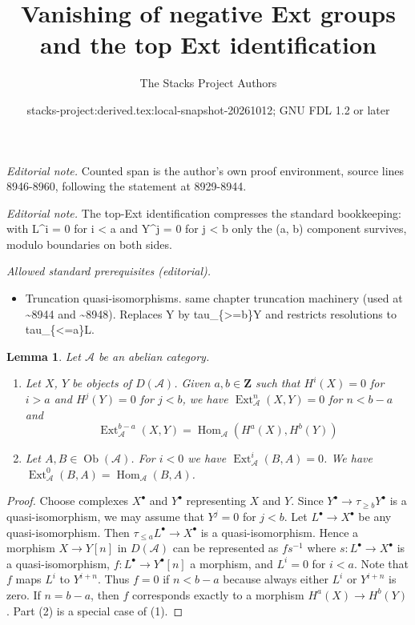 \documentclass{stacks-project}
\title{Vanishing of negative Ext groups and the top Ext identification}
\author{The Stacks Project Authors}
\date{stacks-project:derived.tex:local-snapshot-20261012; GNU FDL 1.2 or later}
\theoremstyle{plain}
\newtheorem{lemma}[subsection]{Lemma}
\theoremstyle{definition}
\theoremstyle{remark}
\numberwithin{equation}{subsection}
\def\Hom{\mathop{\mathrm{Hom}}\nolimits}
\def\Ext{\mathop{\mathrm{Ext}}\nolimits}
\def\Ob{\mathop{\mathrm{Ob}}\nolimits}
\begin{document}
\maketitle
\noindent\textit{Editorial note.} Counted span is the author's own proof environment, source lines 8946-8960, following the statement at 8929-8944.\par\medskip
\noindent\textit{Editorial note.} The top-Ext identification compresses the standard bookkeeping: with L\textasciicircum{}i = 0 for i < a and Y\textasciicircum{}j = 0 for j < b only the (a, b) component survives, modulo boundaries on both sides.\par\medskip
\noindent\textit{Allowed standard prerequisites (editorial).}\begin{itemize}
\item Truncation quasi-isomorphisms. same chapter truncation machinery (used at \textasciitilde{}8944 and \textasciitilde{}8948). Replaces Y by tau\_\{>=b\}Y and restricts resolutions to tau\_\{<=a\}L.
\end{itemize}\medskip
\begin{lemma}
\label{lemma-negative-exts}
Let $\mathcal{A}$ be an abelian category.
\begin{enumerate}
\item Let $X$, $Y$ be objects of $D(\mathcal{A})$. Given $a, b \in \mathbf{Z}$
such that $H^i(X) = 0$ for $i > a$ and $H^j(Y) = 0$
for $j < b$, we have $\Ext^n_\mathcal{A}(X, Y) = 0$ for
$n < b - a$ and
$$
\Ext^{b - a}_\mathcal{A}(X, Y) = \Hom_\mathcal{A}(H^a(X), H^b(Y))
$$
\item Let $A, B \in \Ob(\mathcal{A})$.
For $i < 0$ we have $\Ext^i_\mathcal{A}(B, A) = 0$.
We have $\Ext^0_\mathcal{A}(B, A) = \Hom_\mathcal{A}(B, A)$.
\end{enumerate}
\end{lemma}

\begin{proof}
Choose complexes $X^\bullet$ and $Y^\bullet$ representing $X$ and $Y$.
Since $Y^\bullet \to \tau_{\geq b}Y^\bullet$ is a quasi-isomorphism,
we may assume that $Y^j = 0$ for $j < b$.
Let $L^\bullet \to X^\bullet$ be any quasi-isomorphism.
Then $\tau_{\leq a}L^\bullet \to X^\bullet$
is a quasi-isomorphism. Hence a morphism $X \to Y[n]$
in $D(\mathcal{A})$ can be represented as $fs^{-1}$ where
$s : L^\bullet \to X^\bullet$ is a quasi-isomorphism,
$f : L^\bullet \to Y^\bullet[n]$ a morphism, and
$L^i = 0$ for $i < a$. Note that $f$ maps $L^i$ to $Y^{i + n}$.
Thus $f = 0$ if $n < b - a$ because always either $L^i$ or $Y^{i + n}$ is
zero. If $n = b - a$, then $f$ corresponds exactly to a morphism
$H^a(X) \to H^b(Y)$. Part (2) is a special case of (1).
\end{proof}
\end{document}
